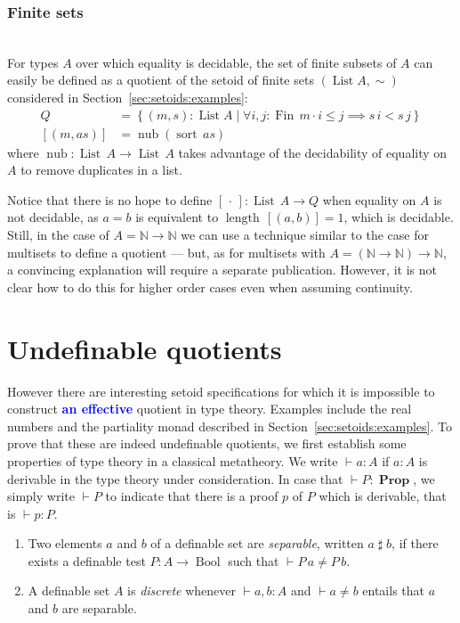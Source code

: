 \documentclass[envcountsame]{llncs}
\newcommand{\amend}[2][]{\textcolor{blue}{#2}}
\newcommand{\adefinable}{\amend[]{\textbf{an effective }}}
\newcommand{\N}{\mathbb{N}}
\newcommand{\dotph}{\,\cdot\,} %
\providecommand{\class}[1]{[#1]}
\providecommand{\set}  [1]{\left\{#1\right\}}
\DeclareMathOperator{\Prop}{\mathbf{Prop}}
\DeclareMathOperator{\Bool}{Bool}
\DeclareMathOperator{\List}{List}
\DeclareMathOperator{\Fin}{Fin}
\DeclareMathOperator{\sort}{sort}
\DeclareMathOperator{\length}{length}
\DeclareMathOperator{\nub}{nub}
\newcommand{\sep}{\mathrel{\sharp}}
\begin{document}
\subsubsection*{Finite sets}\hfill\\

For types $A$ over which equality is decidable,  the set of finite subsets of $A$ can easily be defined as a quotient of the setoid of finite sets $(\List A, \sim)$ considered in Section~\ref{sec:setoids:examples}:
\begin{align*}
Q &= \set{(m , s) : \List A\mid  \forall i,j:\Fin\,m \cdot i\leq j\implies s\,i < s\,j}\\
\class{(m,as)} &=\nub(\sort\,as)
\end{align*}
where $\nub:\List\,A\to\List\,A$ takes advantage of the decidability of equality on $A$ to remove duplicates in a list.

Notice that there is no hope to define   $\class\dotph : \List\,A \to Q$ when equality on $A$ is not decidable, as  $a=b$ is equivalent to $\length\,[(a,b)] = 1$, which is decidable.
Still, in the case of $A = \N \to \N$ we can use a technique similar to the case for multisets to define a quotient --- but, as for multisets with $A=(\N\to\N)\to\N$, a convincing explanation will require a separate publication. However, it is not clear how to do this for higher order cases even when assuming continuity.







\section{Undefinable quotients}
However there are interesting setoid specifications for which it is impossible to construct \adefinable quotient in type theory. Examples include the real numbers and the partiality monad described in Section~\ref{sec:setoids:examples}.
To prove that these are indeed undefinable quotients, we first establish some properties of type theory in a classical metatheory.
We write $\vdash a : A$ if $a : A$ is derivable in the type theory under consideration. In case that $\vdash P : \Prop$, we simply  write $\vdash P$ to indicate that there is a proof $p$ of $P$ which is derivable, that is $\vdash p : P$.
\begin{definition}\hfill
\begin{enumerate}
\item Two elements $a$ and $b$ of a definable set are \emph{separable}, written $a \sep b$, if there exists a definable test $P\colon A\to \Bool$ such that $\vdash P\,a \neq P\,b$.
\item A definable set $A$ is \emph{discrete} whenever $\vdash a, b :A$ and   $\vdash a\not= b$
entails that $a$ and $b$ are separable.
\end{enumerate}
\end{definition}
\end{document}
